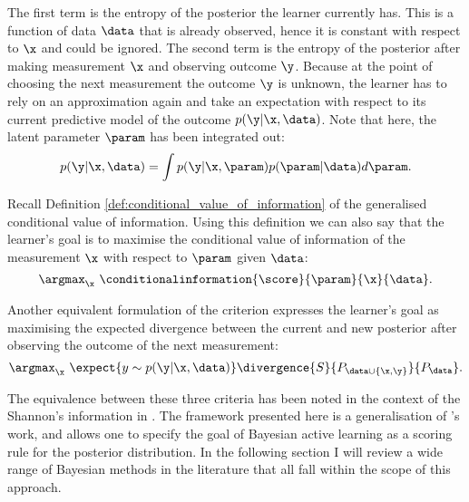 The first term is the entropy of the posterior the learner currently has. This is a function of data $\data$ that is already observed, hence it is constant with respect to $\x$ and could be ignored. The second term is the entropy of the posterior after making measurement $\x$ and observing outcome $\y$. Because at the point of choosing the next measurement the outcome $\y$ is unknown, the learner has to rely on an approximation again and take an expectation with respect to its current predictive model of the outcome $p(\y \vert \x, \data)$. Note that here, the latent parameter $\param$ has been integrated out:
%
\begin{equation}
	p(\y \vert \x, \data) = \int p(\y \vert \x, \param) p(\param \vert \data) d\param.
\end{equation}

Recall Definition \ref{def:conditional_value_of_information} of the generalised conditional value of information. Using this definition we can also say that the learner's goal is to maximise the conditional value of information of the measurement $\x$ with respect to $\param$ given $\data$:
%
\begin{equation}
	\argmax_\x\ \conditionalinformation{\score}{\param}{\x}{\data}.
\end{equation}

Another equivalent formulation of the criterion expresses the learner's goal as maximising the expected divergence between the current and new posterior after observing the outcome of the next measurement:
%
\begin{equation}
	\argmax_\x\  \expect{y \sim p(\y\vert \x, \data)}\divergence{S}{P_{\data\cup\{\x,\y\}}}{P_{\data}}.
	\label{eqn:active_learning_maximise_divergence}
\end{equation}

The equivalence between these three criteria has been noted in the context of the Shannon's information in \citep{MacKay1992}. The framework presented here is a generalisation of \citeauthor{MacKay1992}'s work, and allows one to specify the goal of Bayesian active learning as a scoring rule for the posterior distribution. In the following section I will review a wide range of Bayesian methods in the literature that all fall within the scope of this approach.


